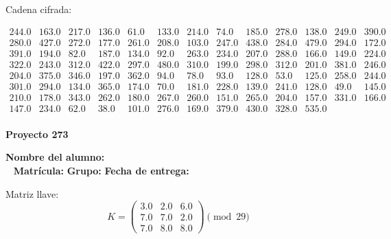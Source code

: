 \documentclass[12pt]{article}
\begin{document}
Cadena cifrada:
\begin{center}
$\begin{array}{lllllllllllll}
244.0 & 163.0 & 217.0 & 136.0 & 61.0 & 133.0 & 214.0 & 74.0 & 185.0 & 278.0 & 138.0 & 249.0 & 390.0\\
280.0 & 427.0 & 272.0 & 177.0 & 261.0 & 208.0 & 103.0 & 247.0 & 438.0 & 284.0 & 479.0 & 294.0 & 172.0\\
391.0 & 194.0 & 82.0 & 187.0 & 134.0 & 92.0 & 263.0 & 234.0 & 207.0 & 288.0 & 166.0 & 149.0 & 224.0\\
322.0 & 243.0 & 312.0 & 422.0 & 297.0 & 480.0 & 310.0 & 199.0 & 298.0 & 312.0 & 201.0 & 381.0 & 246.0\\
204.0 & 375.0 & 346.0 & 197.0 & 362.0 & 94.0 & 78.0 & 93.0 & 128.0 & 53.0 & 125.0 & 258.0 & 244.0\\
301.0 & 294.0 & 134.0 & 365.0 & 174.0 & 70.0 & 181.0 & 228.0 & 139.0 & 241.0 & 128.0 & 49.0 & 145.0\\
210.0 & 178.0 & 343.0 & 262.0 & 180.0 & 267.0 & 260.0 & 151.0 & 265.0 & 204.0 & 157.0 & 331.0 & 166.0\\
147.0 & 234.0 & 62.0 & 38.0 & 101.0 & 276.0 & 169.0 & 379.0 & 430.0 & 328.0 & 535.0\\
\end{array}$
\end{center}

\newpage


\textbf{Proyecto 273}

\textbf{Nombre del alumno:} \underline{\hspace{13cm}}\\\
\vspace{1cm}
\textbf{Matrícula:} \underline{\hspace{4cm}} \hspace{1cm}
\textbf{Grupo:} \underline{\hspace{2cm}}
\textbf{Fecha de entrega:} \underline{\hspace{2cm}}

\medskip

Matriz llave:
\[
K = \begin{pmatrix}
3.0 & 2.0 & 6.0\\
7.0 & 7.0 & 2.0\\
7.0 & 8.0 & 8.0
\end{pmatrix} \pmod{29}
\]
\end{document}
